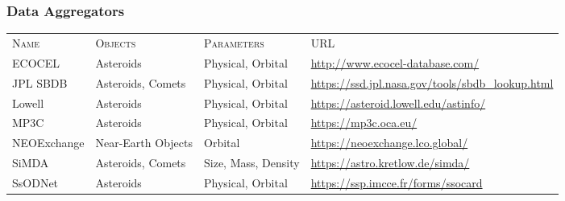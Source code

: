 \begin{frame}
\begin{columns}[T]
\begin{column}{.7\textwidth}
\begin{overlayarea}{\textwidth}{\textheight}
\begin{itemize}[<.->]
          \end{itemize}

      \end{overlayarea}
    \end{column}

  \end{columns}

\end{frame}

\begin{frame}[t]
  \frametitle{Data Aggregators}
  {\scriptsize
  \begin{table}[t]
    \begin{tabular}{llll}
      \textsc{Name} & \textsc{Objects} & \textsc{Parameters} & \textsc{URL} \bigskip\\
      ECOCEL & Asteroids & Physical, Orbital &  \tiny \url{http://www.ecocel-database.com/}\smallskip\\
      JPL SBDB & Asteroids, Comets & Physical, Orbital & \tiny \url{https://ssd.jpl.nasa.gov/tools/sbdb_lookup.html}\smallskip\\
      Lowell & Asteroids & Physical, Orbital &  \tiny\url{https://asteroid.lowell.edu/astinfo/}\smallskip\\
      MP3C & Asteroids & Physical, Orbital &  \tiny\url{https://mp3c.oca.eu/}\smallskip\\
      NEOExchange & Near-Earth Objects & Orbital &  \tiny\url{https://neoexchange.lco.global/}\smallskip\\
      SiMDA & Asteroids, Comets & Size, Mass, Density & \tiny \url{https://astro.kretlow.de/simda/}\smallskip\\
      SsODNet & Asteroids & Physical, Orbital & \tiny \url{https://ssp.imcce.fr/forms/ssocard}\smallskip\\
    \end{tabular}
  \end{table}
  }
\end{frame}

